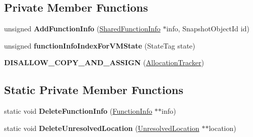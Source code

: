 \subsection*{Private Member Functions}
\begin{DoxyCompactItemize}
\item 
unsigned {\bfseries Add\+Function\+Info} (\hyperlink{classv8_1_1internal_1_1_shared_function_info}{Shared\+Function\+Info} $\ast$info, Snapshot\+Object\+Id id)\hypertarget{classv8_1_1internal_1_1_allocation_tracker_a230cbe58c384c06817de9b1a15c7cb09}{}\label{classv8_1_1internal_1_1_allocation_tracker_a230cbe58c384c06817de9b1a15c7cb09}

\item 
unsigned {\bfseries function\+Info\+Index\+For\+V\+M\+State} (State\+Tag state)\hypertarget{classv8_1_1internal_1_1_allocation_tracker_a45e9bdead8b15ff607262ae84127b038}{}\label{classv8_1_1internal_1_1_allocation_tracker_a45e9bdead8b15ff607262ae84127b038}

\item 
{\bfseries D\+I\+S\+A\+L\+L\+O\+W\+\_\+\+C\+O\+P\+Y\+\_\+\+A\+N\+D\+\_\+\+A\+S\+S\+I\+GN} (\hyperlink{classv8_1_1internal_1_1_allocation_tracker}{Allocation\+Tracker})\hypertarget{classv8_1_1internal_1_1_allocation_tracker_a0164c24c32589a2e09f645f410fea381}{}\label{classv8_1_1internal_1_1_allocation_tracker_a0164c24c32589a2e09f645f410fea381}

\end{DoxyCompactItemize}
\subsection*{Static Private Member Functions}
\begin{DoxyCompactItemize}
\item 
static void {\bfseries Delete\+Function\+Info} (\hyperlink{structv8_1_1internal_1_1_allocation_tracker_1_1_function_info}{Function\+Info} $\ast$$\ast$info)\hypertarget{classv8_1_1internal_1_1_allocation_tracker_aa8c6d9f918ab4f4fac36215599c71faa}{}\label{classv8_1_1internal_1_1_allocation_tracker_aa8c6d9f918ab4f4fac36215599c71faa}

\item 
static void {\bfseries Delete\+Unresolved\+Location} (\hyperlink{classv8_1_1internal_1_1_allocation_tracker_1_1_unresolved_location}{Unresolved\+Location} $\ast$$\ast$location)\hypertarget{classv8_1_1internal_1_1_allocation_tracker_af0643d03e87ccb06ea0d2d2eee79b8a3}{}\label{classv8_1_1internal_1_1_allocation_tracker_af0643d03e87ccb06ea0d2d2eee79b8a3}

\end{DoxyCompactItemize}

